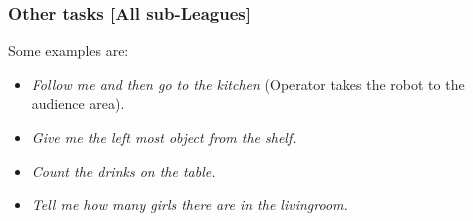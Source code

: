 \subsubsection{Other tasks [All sub-Leagues]}
Some examples are:
\begin{itemize}
	\item \textit{Follow me and then go to the kitchen} (Operator takes the robot to the audience area).
	\item \textit{Give me the left most object from the shelf.}
	\item \textit{Count the drinks on the table.}
	\item \textit{Tell me how many girls there are in the livingroom.}
\end{itemize}


